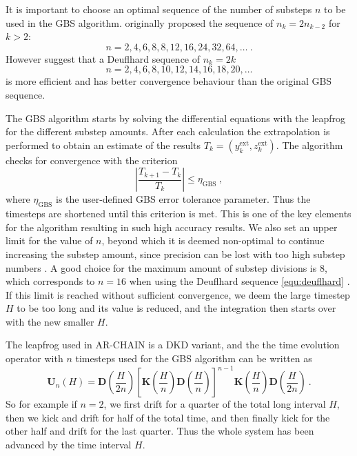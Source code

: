 \documentclass[english, oneside]{HYgradu}
\begin{document}
It is important to choose an optimal sequence of the number of substeps $n$ to be used in the GBS algorithm. \cite{bulirsch:1966} originally proposed the sequence of $n_k = 2n_{k-2}$ for $k > 2$:
\begin{equation}
n = 2,4,6,8,8,12,16,24,32,64, \ldots \ .
\end{equation}
However \cite{press:2007} suggest that a Deuflhard sequence of $n_k = 2k$
\begin{equation}
n = 2,4,6,8,10,12,14,16,18,20, \ldots \label{equ:deuflhard}
\end{equation}
is more efficient and has better convergence behaviour than the original GBS sequence. 

The GBS algorithm starts by solving the differential equations with the leapfrog for the different substep amounts. After each calculation the extrapolation is performed to obtain an estimate of the results $T_k = (y_k^{\mathrm{ext}}, z_k^{\mathrm{ext}})$. The algorithm checks for convergence with the criterion
\begin{equation}
\left| \frac{T_{k+1} - T_k}{T_k} \right| \leq \eta_{\mathrm{GBS}} \ ,
\end{equation}
where $\eta_{\mathrm{GBS}}$ is the user-defined GBS error tolerance parameter. Thus the timesteps are shortened until this criterion is met. This is one of the key elements for the algorithm resulting in such high accuracy results. We also set an upper limit for the value of $n$, beyond which it is deemed non-optimal to continue increasing the substep amount, since precision can be lost with too high substep numbers \citep{press:2007}. A good choice for the maximum amount of substep divisions is 8, which corresponds to $n = 16$ when using the Deuflhard sequence \ref{equ:deuflhard} \citep{press:2007}. If this limit is reached without sufficient convergence, we deem the large timestep $H$ to be too long and its value is reduced, and the integration then starts over with the new smaller $H$.

The leapfrog used in AR-CHAIN is a DKD variant, and the the time evolution operator with $n$ timesteps used for the GBS algorithm can be written as
\begin{equation}
\mathbf{U}_n(H) = \mathbf{D} \left( \frac{H}{2n} \right) \left[ \mathbf{K} \left( \frac{H}{n} \right) \mathbf{D} \left( \frac{H}{n} \right) \right]^{n-1} \mathbf{K} \left( \frac{H}{n} \right) \mathbf{D} \left( \frac{H}{2n} \right) \ . \label{equ:GBSLeapfrog}
\end{equation}
So for example if $n=2$, we first drift for a quarter of the total long interval $H$, then we kick and drift for half of the total time, and then finally kick for the other half and drift for the last quarter. Thus the whole system has been advanced by the time interval $H$.
\end{document}
